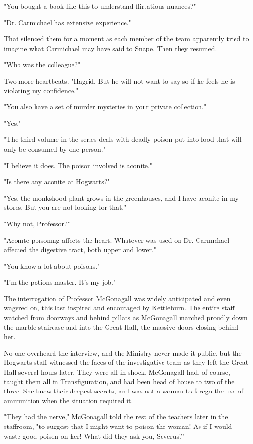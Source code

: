 \documentclass[a4paper,11pt]{article}
\begin{document}
"You bought a book like this to understand flirtatious nuances?"

"Dr. Carmichael has extensive experience."

That silenced them for a moment as each member of the team apparently tried to imagine what Carmichael may have said to Snape. Then they resumed.

"Who was the colleague?"

Two more heartbeats. "Hagrid. But he will not want to say so if he feels he is violating my confidence."

"You also have a set of murder mysteries in your private collection."

"Yes."

"The third volume in the series deals with deadly poison put into food that will only be consumed by one person."

"I believe it does. The poison involved is aconite."

"Is there any aconite at Hogwarts?"

"Yes, the monkshood plant grows in the greenhouses, and I have aconite in my stores. But you are not looking for that."

"Why not, Professor?"

"Aconite poisoning affects the heart. Whatever was used on Dr. Carmichael affected the digestive tract, both upper and lower."

"You know a lot about poisons."

"I'm the potions master. It's my job."

The interrogation of Professor McGonagall was widely anticipated and even wagered on, this last inspired and encouraged by Kettleburn. The entire staff watched from doorways and behind pillars as McGonagall marched proudly down the marble staircase and into the Great Hall, the massive doors closing behind her.

No one overheard the interview, and the Ministry never made it public, but the Hogwarts staff witnessed the faces of the investigative team as they left the Great Hall several hours later. They were all in shock. McGonagall had, of course, taught them all in Transfiguration, and had been head of house to two of the three. She knew their deepest secrets, and was not a woman to forego the use of ammunition when the situation required it.

"They had the nerve," McGonagall told the rest of the teachers later in the staffroom, "to suggest that I might want to poison the woman! As if I would waste good poison on her! What did they ask you, Severus?"
\end{document}

